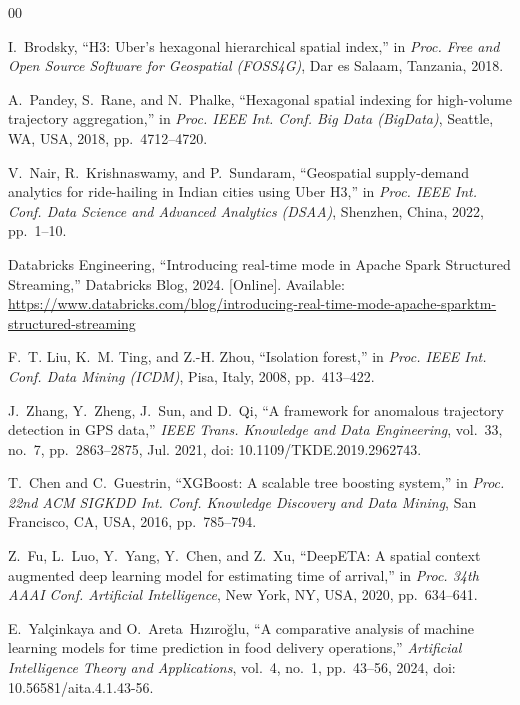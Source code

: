 \documentclass[conference]{IEEEtran}
\begin{document}
\begin{thebibliography}{00}

I.~Brodsky,
``H3: Uber's hexagonal hierarchical spatial index,''
in \textit{Proc. Free and Open Source Software for Geospatial
(FOSS4G)}, Dar es Salaam, Tanzania, 2018.

A.~Pandey, S.~Rane, and N.~Phalke,
``Hexagonal spatial indexing for high-volume trajectory aggregation,''
in \textit{Proc. IEEE Int. Conf. Big Data (BigData)},
Seattle, WA, USA, 2018, pp.~4712--4720.

V.~Nair, R.~Krishnaswamy, and P.~Sundaram,
``Geospatial supply-demand analytics for ride-hailing in Indian cities
using Uber H3,''
in \textit{Proc. IEEE Int. Conf. Data Science and Advanced Analytics
(DSAA)}, Shenzhen, China, 2022, pp.~1--10.


Databricks Engineering,
``Introducing real-time mode in Apache Spark Structured Streaming,''
Databricks Blog, 2024. [Online]. Available:
\url{https://www.databricks.com/blog/introducing-real-time-mode-apache-sparktm-structured-streaming}

F.~T. Liu, K.~M. Ting, and Z.-H. Zhou,
``Isolation forest,''
in \textit{Proc. IEEE Int. Conf. Data Mining (ICDM)},
Pisa, Italy, 2008, pp.~413--422.

J.~Zhang, Y.~Zheng, J.~Sun, and D.~Qi,
``A framework for anomalous trajectory detection in GPS data,''
\textit{IEEE Trans. Knowledge and Data Engineering}, vol.~33, no.~7,
pp.~2863--2875, Jul. 2021,
doi: 10.1109/TKDE.2019.2962743.

T.~Chen and C.~Guestrin,
``XGBoost: A scalable tree boosting system,''
in \textit{Proc. 22nd ACM SIGKDD Int. Conf. Knowledge Discovery and
Data Mining}, San Francisco, CA, USA, 2016, pp.~785--794.


Z.~Fu, L.~Luo, Y.~Yang, Y.~Chen, and Z.~Xu,
``DeepETA: A spatial context augmented deep learning model for
estimating time of arrival,''
in \textit{Proc. 34th AAAI Conf. Artificial Intelligence},
New York, NY, USA, 2020, pp.~634--641.

E.~Yalçinkaya and O.~Areta~Hızıroğlu,
``A comparative analysis of machine learning models for time prediction
in food delivery operations,''
\textit{Artificial Intelligence Theory and Applications}, vol.~4,
no.~1, pp.~43--56, 2024,
doi: 10.56581/aita.4.1.43-56.


\end{thebibliography}
\end{document}
